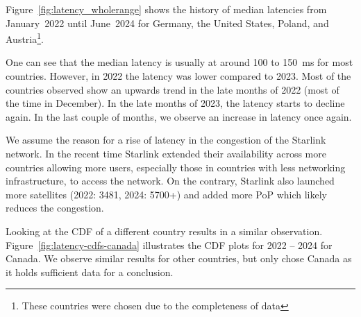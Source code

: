 Figure~\ref{fig:latency_wholerange} shows the history of median latencies from
January~2022 until June~2024 for Germany, the United States, Poland, and
Austria\footnote{These countries were chosen due to the completeness of data}.

One can see that the median latency is usually at around 100 to 150~ms for most
countries. However, in 2022 the latency was lower compared to 2023. Most of the
countries observed show an upwards trend in the late months of 2022 (most of
the time in December). In the late months of 2023, the latency starts to
decline again. In the last couple of months, we observe an increase in latency
once again.

We assume the reason for a rise of latency in the congestion of the Starlink
network. In the recent time Starlink extended their availability across more
countries allowing more users, especially those in countries with less
networking infrastructure, to access the network.
On the contrary, Starlink also launched more satellites (2022: 3481, 2024:
5700+) and added more \ac{PoP} which likely reduces the congestion.

Looking at the CDF of a different country results in a similar observation.
Figure~\ref{fig:latency-cdfs-canada} illustrates the CDF plots for 2022 -- 2024
for Canada. We observe similar results for other countries, but only chose
Canada as it holds sufficient data for a conclusion.

